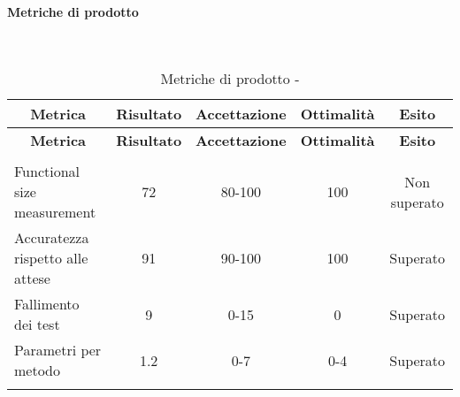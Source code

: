 \paragraph{Metriche di prodotto}\mbox{}\\
\begin{longtable}{|m{5cm}|c|c|c|c|}
	\hline \multicolumn{1}{|c|}{\textbf{Metrica}} & \multicolumn{1}{c|}{\textbf{Risultato}} & \multicolumn{1}{c|}{\textbf{Accettazione}} & \multicolumn{1}{c|}{\textbf{Ottimalità}} & \multicolumn{1}{c|}{\textbf{Esito}}\\
	\hline 
	\endfirsthead
	
	\hline \multicolumn{1}{|c|}{\textbf{Metrica}} & \multicolumn{1}{c|}{\textbf{Risultato}} & \multicolumn{1}{c|}{\textbf{Accettazione}} & \multicolumn{1}{c|}{\textbf{Ottimalità}} & \multicolumn{1}{c|}{\textbf{Esito}}\\
	\hline 
	\endhead
	
	\hline \multicolumn{5}{|r|}{\ToBeContinued} \\ 
	\hline
	\endfoot
	
	\hline
	\endlastfoot
	
	\hline Functional size measurement & 72 & 80-100 & 100 & Non superato \\
	\hline Accuratezza rispetto alle attese & 91 & 90-100 & 100 & Superato\\
	\hline Fallimento dei test & 9 & 0-15 & 0 & Superato \\
	\hline Parametri per metodo & 1.2 & 0-7 & 0-4 & Superato \\
	\hline
	\caption{Metriche di prodotto - \RQ{}}
\end{longtable}